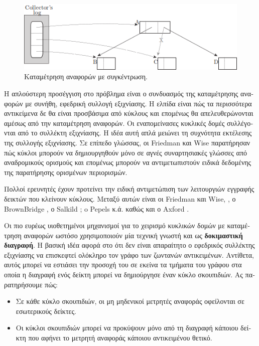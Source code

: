 \begin{greek}
\begin{figure}
  \centering
  \includegraphics{figures/refcnt_1}
  \caption{Καταμέτρηση αναφορών με συγκέντρωση.}
  \label{fig:refcnt_1}  
\end{figure}

Η απλούστερη προσέγγιση στο πρόβλημα είναι ο συνδυασμός της
καταμέτρησης αναφορών με συνήθη, εφεδρική συλλογή εξιχνίασης.
Η ελπίδα είναι πώς τα περισσότερα αντικείμενα δε θα είναι 
προσβάσιμα από κύκλους και επομένως θα απελευθερώνονται
αμέσως από την καταμέτρηση αναφορών. Οι εναπομείνασες
κυκλικές δομές συλλέγονται από το συλλέκτη εξιχνίασης. Η
ιδέα αυτή απλά μειώνει τη συχνότητα εκτέλεσης της συλλογής
εξιχνίασης. Σε επίπεδο γλώσσας, οι Friedman και Wise
\cite{DBLP:journals/ipl/FriedmanW79} παρατήρησαν πώς κύκλοι
μπορούν να δημιουργηθούν μόνο σε αγνές συναρτησιακές γλώσσες
από αναδρομικούς ορισμούς και επομένως μπορούν να
αντιμετωπιστούν ειδικά δεδομένης της παρατήρησης ορισμένων
περιορισμών.

Πολλοί ερευνητές έχουν προτείνει την ειδική αντιμετώπιση
των λειτουργιών εγγραφής δεικτών που κλείνουν κύκλους.
Μεταξύ αυτών είναι οι Friedman και Wise,
\cite{DBLP:journals/ipl/FriedmanW79}, ο BrownBridge
\cite{DBLP:conf/fpca/Brownbridge85}, ο Salkild
\cite{salkild1987implementation}; o Pepels κ.ά.
\cite{pepels1988cyclic} καθώς και ο Axford
\cite{DBLP:journals/cj/Axford90}.

Οι πιο ευρέως υιοθετημένοι μηχανισμοί για το χειρισμό
κυκλικών δομών με καταμέτρηση αναφορών ωστόσο χρησιμοποιούν
μία τεχνική γνωστή και ως \textbf{δοκιμαστική διαγραφή}.
Η βασική ιδέα αφορά στο ότι δεν είναι απαραίτητο ο εφεδρικός
συλλέκτης εξιχνίασης να επισκεφτεί ολόκληρο τον γράφο των
ζωντανών αντικειμένων. Αντίθετα, αυτός μπορεί να εστιάσει
την προσοχή του σε εκείνα τα τμήματα του γράφου στα οποία
η διαγραφή ενός δείκτη μπορεί να δημιούργησε έναν κύκλο
σκουπιδιών. Ας παρατηρήσουμε πώς:

\begin{itemize}
  \item Σε κάθε κύκλο σκουπιδιών, οι μη μηδενικοί μετρητές
    αναφοράς οφείλονται σε εσωτερικούς δείκτες.
  \item Οι κύκλοι σκουπιδιών μπορεί να προκύψουν μόνο από τη
    διαγραφή κάποιου δείκτη που αφήνει το μετρητή αναφοράς
    κάποιου αντικειμένου θετικό.
\end{itemize} 


\end{greek}

